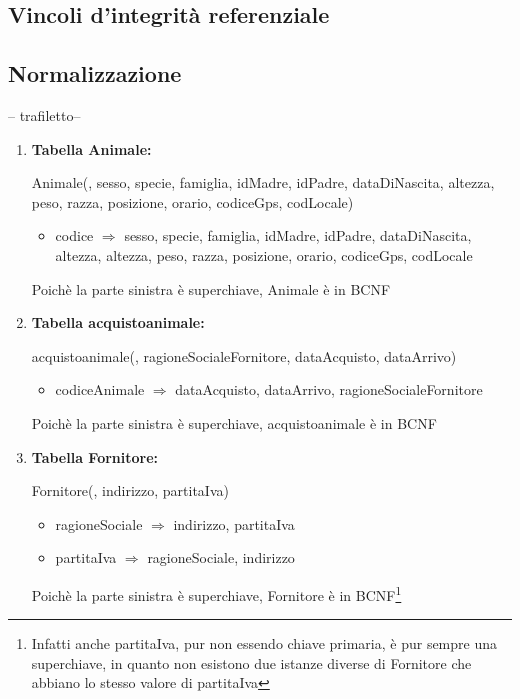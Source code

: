 \documentclass[12pt,a4paper]{article}
\begin{document}
\subsection{Vincoli d'integrità referenziale}

\subsection{Normalizzazione}
-- trafiletto--
\begin{enumerate}



\item[] \textbf{Tabella Animale:}

Animale(\underline{}, sesso, specie, famiglia, idMadre, idPadre, dataDiNascita, altezza, peso, razza, posizione, orario,  codiceGps,  codLocale)
\begin{itemize}
\vspace{-5pt}
\item codice $\Rightarrow$ sesso, specie, famiglia, idMadre, idPadre, dataDiNascita, altezza, altezza, peso, razza, posizione, orario, codiceGps, codLocale
\vspace{-5pt}
\end{itemize}
Poichè la parte sinistra è superchiave, Animale è in BCNF
\vspace{10pt}



\item[] \textbf{Tabella acquistoanimale:}

acquistoanimale(\underline{}, ragioneSocialeFornitore,  dataAcquisto,  dataArrivo)
\begin{itemize}
\vspace{-5pt}
\item codiceAnimale $\Rightarrow$ dataAcquisto, dataArrivo, ragioneSocialeFornitore
\vspace{-5pt}
\end{itemize}
Poichè la parte sinistra è superchiave, acquistoanimale è in BCNF
\vspace{10pt}



\item[] \textbf{Tabella Fornitore:}

Fornitore(\underline{}, indirizzo, partitaIva)
\begin{itemize}
\vspace{-5pt}
\item ragioneSociale $\Rightarrow$ indirizzo, partitaIva
\item partitaIva $\Rightarrow$ ragioneSociale, indirizzo
\vspace{-5pt}
\end{itemize}
Poichè la parte sinistra è superchiave, Fornitore è in BCNF\footnote{Infatti anche partitaIva, pur non essendo chiave primaria, è pur sempre una superchiave, in quanto non esistono due  istanze diverse di Fornitore che abbiano lo stesso valore di partitaIva}
\vspace{10pt}




\end{enumerate}
\end{document}
